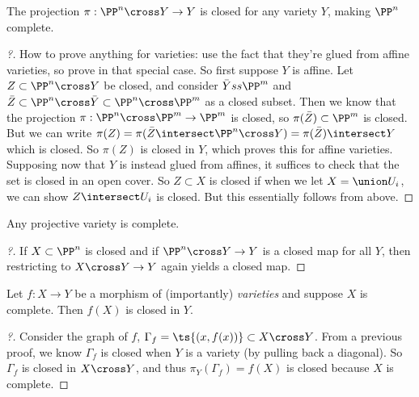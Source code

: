 \begin{corollary}[?]

The projection \(\pi: \PP^n\cross Y\to Y\) is closed for any variety
\(Y\), making \(\PP^n\) complete.

\end{corollary}

\begin{proof}[?]

How to prove anything for varieties: use the fact that they're glued
from affine varieties, so prove in that special case. So first suppose
\(Y\) is affine. Let \(Z \subset \PP^n \cross Y\) be closed, and
consider \(\bar Y ss \PP^m\) and
\(\bar Z \subset\PP^n \cross \bar Y \subset\PP^n \cross \PP^m\) as a
closed subset. Then we know that the projection
\(\pi: \PP^n \cross \PP^m \to \PP^m\) is closed, so
\(\pi(\bar Z) \subset\PP^m\) is closed. But we can write
\(\pi(Z) = \pi(\bar Z \intersect \PP^n \cross Y) = \pi(\bar Z) \intersect Y\)
which is closed. So \(\pi(Z)\) is closed in \(Y\), which proves this for
affine varieties.\\

Supposing now that \(Y\) is instead glued from affines, it suffices to
check that the set is closed in an open cover. So \(Z \subset X\) is
closed if when we let \(X = \union U_i\), we can show
\(Z \intersect U_i\) is closed. But this essentially follows from above.

\end{proof}

\begin{corollary}[?]

Any projective variety is complete.

\end{corollary}

\begin{proof}[?]

If \(X \subset \PP^n\) is closed and if \(\PP^n \cross Y\to Y\) is a
closed map for all \(Y\), then restricting to \(X\cross Y\to Y\) again
yields a closed map.

\end{proof}

\begin{corollary}[?]

Let \(f:X\to Y\) be a morphism of (importantly) \emph{varieties} and
suppose \(X\) is complete. Then \(f(X)\) is closed in \(Y\).

\end{corollary}

\begin{proof}[?]

Consider the graph of \(f\),
\(\Gamma_f = \ts{(x, f(x))} \subset X\cross Y\). From a previous proof,
we know \(\Gamma_f\) is closed when \(Y\) is a variety (by pulling back
a diagonal). So \(\Gamma_f\) is closed in \(X\cross Y\), and thus
\(\pi_Y(\Gamma_f) = f(X)\) is closed because \(X\) is complete.

\end{proof}

